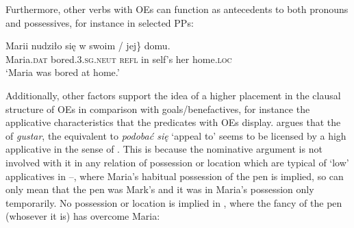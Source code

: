 \documentclass[output=paper,nonflat,colorlinks,citecolor=brown,newtxmath]{langsci/langscibook}
\begin{document}
\noindent Furthermore, other verbs with  OEs can function as antecedents to both  pronouns and  possessives, for instance in selected PPs:

\ea \label{ex:witkos:38}{
\gll Marii nudziło się w \minsp{\{} swoim / jej\} domu.\\
     Maria.\textsc{dat} bored.\textsc{3.sg.neut} \textsc{refl} in {} self’s {} her home.\textsc{loc}\\
\glt `Maria was bored at home.'
}
\z

\noindent Additionally, other factors support the idea of a higher placement in the clausal structure of  OEs in comparison with  goals/benefactives, for instance the applicative characteristics that the predicates with  OEs display. \cite{cuervo2003} argues that the  of \textit{gustar}, the  equivalent to \textit{podobać się}  ‘appeal to’ seems to be licensed by a high applicative in the sense of \cite{pylkkanen2002}. This is because the nominative argument is not involved with it in any relation of possession or location which are typical of ‘low’ applicatives in --, where Maria’s habitual possession of the pen is implied, so  can only mean that the pen was Mark’s and it was in Maria’s  possession only temporarily. No possession or location is implied in , where the fancy of the pen (whosever it is) has overcome Maria:

\ea \label{ex:witkos:39}
	\z
\z

\ea \label{ex:witkos:40}
	\z
\z
\end{document}
